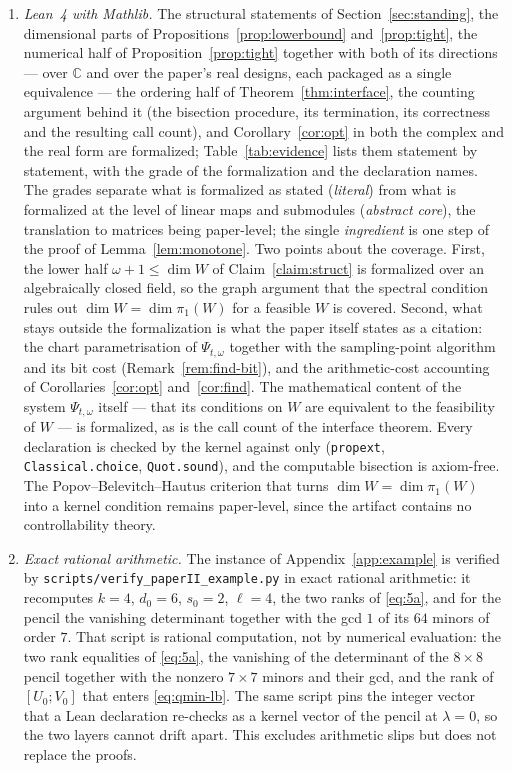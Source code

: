 ﻿\documentclass[journal]{IEEEtran}
\theoremstyle{plainn}
\theoremstyle{remark}
\begin{document}
\begin{enumerate}
\item \emph{Lean~4 with Mathlib.} The structural statements of Section~\ref{sec:standing}, the
dimensional parts of Propositions~\ref{prop:lowerbound} and~\ref{prop:tight}, the numerical half of
Proposition~\ref{prop:tight} together with both of its directions --- over $\mathbb C$ and over the
paper's real designs, each packaged as a single equivalence --- the ordering half of
Theorem~\ref{thm:interface}, the counting argument behind it (the bisection procedure, its
termination, its correctness and the resulting call count), and Corollary~\ref{cor:opt} in both the
complex and the real form are formalized; Table~\ref{tab:evidence} lists them statement by
statement, with the grade of the formalization and the declaration names. The grades separate what
is formalized as stated (\emph{literal}) from what is formalized at the level of linear maps and
submodules (\emph{abstract core}), the translation to matrices being paper-level; the single
\emph{ingredient} is one step of the proof of Lemma~\ref{lem:monotone}. Two points about the
coverage. First, the lower half $\omega+1\le\dim W$ of Claim~\ref{claim:struct} is formalized over an
algebraically closed field, so the graph argument that the spectral condition rules out
$\dim W=\dim\pi_1(W)$ for a feasible $W$ is covered. Second, what stays outside the formalization is
what the paper itself states as a citation: the chart parametrisation of $\Psi_{t,\omega}$ together
with the sampling-point algorithm and its bit cost (Remark~\ref{rem:find-bit}), and the
arithmetic-cost accounting of Corollaries~\ref{cor:opt} and~\ref{cor:find}. The mathematical content
of the system $\Psi_{t,\omega}$ itself --- that its conditions on $W$ are equivalent to the
feasibility of $W$ --- is formalized, as is the call count of the interface theorem. Every
declaration is checked by the kernel against only (\texttt{propext}, \texttt{Classical.choice},
\texttt{Quot.sound}), and the computable bisection is axiom-free. The Popov--Belevitch--Hautus
criterion that turns $\dim W=\dim\pi_1(W)$ into a kernel condition remains paper-level, since the
artifact contains no controllability theory.
\item \emph{Exact rational arithmetic.} The instance of Appendix~\ref{app:example} is verified by
\texttt{scripts/verify\_paperII\_example.py} in exact rational arithmetic: it recomputes
$k=4$, $d_0=6$, $s_0=2$, $\ell=4$, the two ranks of \eqref{eq:5a}, and for the pencil the
vanishing determinant together with the gcd $1$ of its $64$ minors of order $7$.  That script is
rational computation, not by numerical evaluation: the two rank equalities of \eqref{eq:5a}, the
vanishing of the determinant of the $8\times8$ pencil together with the nonzero $7\times7$ minors and
their gcd, and the rank of $[U_0;V_0]$ that enters \eqref{eq:qmin-lb}. The same script pins the
integer vector that a Lean declaration re-checks as a kernel vector of the pencil at $\lambda=0$, so
the two layers cannot drift apart. This excludes arithmetic slips but does not replace the proofs.
\end{enumerate}
\end{document}
